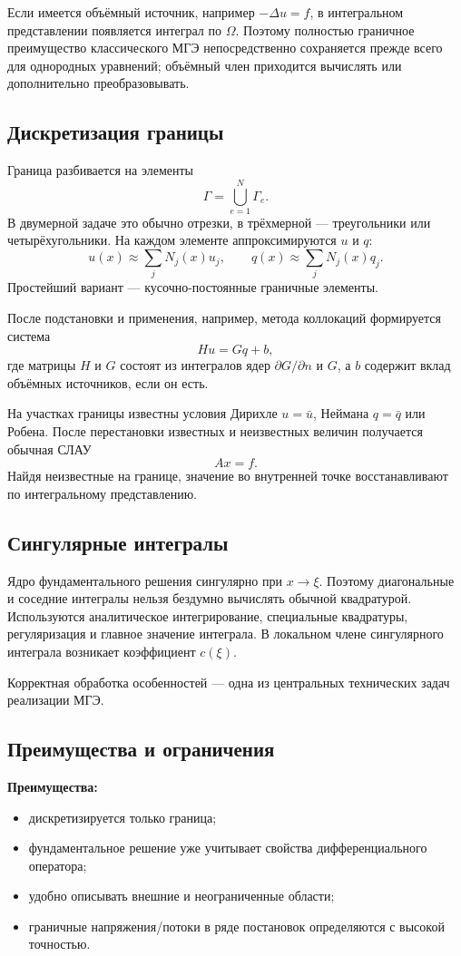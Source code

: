 Если имеется объёмный источник, например $-\Delta u=f$, в интегральном представлении появляется интеграл по $\Omega$. Поэтому полностью граничное преимущество классического МГЭ непосредственно сохраняется прежде всего для однородных уравнений; объёмный член приходится вычислять или дополнительно преобразовывать.

\subsection{Дискретизация границы}

Граница разбивается на элементы
\[
\Gamma=\bigcup_{e=1}^{N}\Gamma_e.
\]
В двумерной задаче это обычно отрезки, в трёхмерной --- треугольники или четырёхугольники. На каждом элементе аппроксимируются $u$ и $q$:
\[
u(x)\approx\sum_jN_j(x)u_j,
\qquad
q(x)\approx\sum_jN_j(x)q_j.
\]
Простейший вариант --- кусочно-постоянные граничные элементы.

После подстановки и применения, например, метода коллокаций формируется система
\[
\boxed{Hu=Gq+b},
\]
где матрицы $H$ и $G$ состоят из интегралов ядер $\partial G/\partial n$ и $G$, а $b$ содержит вклад объёмных источников, если он есть.

На участках границы известны условия Дирихле $u=\bar u$, Неймана $q=\bar q$ или Робена. После перестановки известных и неизвестных величин получается обычная СЛАУ
\[
Ax=f.
\]
Найдя неизвестные на границе, значение во внутренней точке восстанавливают по интегральному представлению.

\subsection{Сингулярные интегралы}

Ядро фундаментального решения сингулярно при $x\to\xi$. Поэтому диагональные и соседние интегралы нельзя бездумно вычислять обычной квадратурой. Используются аналитическое интегрирование, специальные квадратуры, регуляризация и главное значение интеграла. В локальном члене сингулярного интеграла возникает коэффициент $c(\xi)$.

Корректная обработка особенностей --- одна из центральных технических задач реализации МГЭ.

\subsection{Преимущества и ограничения}

\textbf{Преимущества:}
\begin{itemize}
\item дискретизируется только граница;
\item фундаментальное решение уже учитывает свойства дифференциального оператора;
\item удобно описывать внешние и неограниченные области;
\item граничные напряжения/потоки в ряде постановок определяются с высокой точностью.
\end{itemize}

